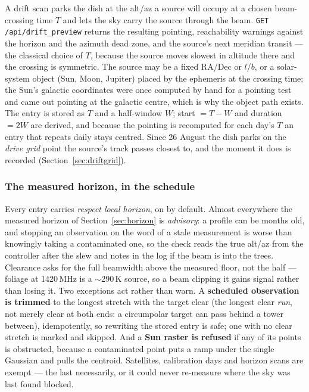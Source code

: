 \documentclass[11pt,a4paper]{article}
\begin{document}
A drift scan parks the dish at the alt/az a source will occupy at a chosen beam-crossing time $T$ and lets the sky carry the source through the beam. \texttt{GET /api/drift\_preview} returns the resulting pointing, reachability warnings against the horizon and the azimuth dead zone, and the source's next meridian transit --- the classical choice of $T$, because the source moves slowest in altitude there and the crossing is symmetric. The source may be a fixed RA/Dec or $l$/$b$, or a solar-system object (Sun, Moon, Jupiter) placed by the ephemeris at the crossing time; the Sun's galactic coordinates were once computed by hand for a pointing test and came out pointing at the galactic centre, which is why the object path exists. The entry is stored as $T$ and a half-window $W$; start $= T - W$ and duration $= 2W$ are derived, and because the pointing is recomputed for each day's $T$ an entry that repeats daily stays centred. Since 26 August the dish parks on the \emph{drive grid} point the source's track passes closest to, and the moment it does is recorded (Section~\ref{sec:driftgrid}).

\subsubsection{The measured horizon, in the schedule}

Every entry carries \emph{respect local horizon}, on by default. Almost everywhere the measured horizon of Section~\ref{sec:horizon} is \emph{advisory}: a profile can be months old, and stopping an observation on the word of a stale measurement is worse than knowingly taking a contaminated one, so the check reads the true alt/az from the controller after the slew and notes in the log if the beam is into the trees. Clearance asks for the full beamwidth above the measured floor, not the half --- foliage at 1420\,MHz is a $\sim$290\,K source, so a beam clipping it gains signal rather than losing it. Two exceptions act rather than warn. A \textbf{scheduled observation is trimmed} to the longest stretch with the target clear (the longest clear \emph{run}, not merely clear at both ends: a circumpolar target can pass behind a tower between), idempotently, so rewriting the stored entry is safe; one with no clear stretch is marked and skipped. And a \textbf{Sun raster is refused} if any of its points is obstructed, because a contaminated point puts a ramp under the single Gaussian and pulls the centroid. Satellites, calibration days and horizon scans are exempt --- the last necessarily, or it could never re-measure where the sky was last found blocked.
\end{document}
